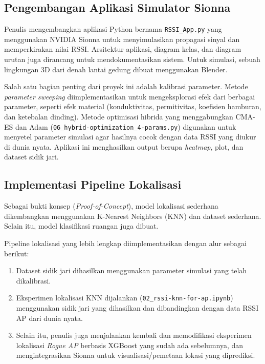 \subsection{Pengembangan Aplikasi Simulator Sionna}
Penulis mengembangkan aplikasi Python bernama \texttt{RSSI\_App.py} yang menggunakan NVIDIA Sionna untuk menyimulasikan propagasi sinyal dan memperkirakan nilai RSSI. Arsitektur aplikasi, diagram kelas, dan diagram urutan juga dirancang untuk mendokumentasikan sistem. Untuk simulasi, sebuah lingkungan 3D dari denah lantai gedung dibuat menggunakan Blender.

Salah satu bagian penting dari proyek ini adalah kalibrasi parameter. Metode \textit{parameter sweeping} diimplementasikan untuk mengeksplorasi efek dari berbagai parameter, seperti efek material (konduktivitas, permitivitas, koefisien hamburan, dan ketebalan dinding). Metode optimisasi hibrida yang menggabungkan CMA-ES dan Adam (\texttt{06\_hybrid-optimization\_4-params.py}) digunakan untuk menyetel parameter simulasi agar hasilnya cocok dengan data RSSI yang diukur di dunia nyata. Aplikasi ini menghasilkan output berupa \textit{heatmap}, plot, dan dataset sidik jari.

\subsection{Implementasi Pipeline Lokalisasi}
Sebagai bukti konsep (\textit{Proof-of-Concept}), model lokalisasi sederhana dikembangkan menggunakan K-Nearest Neighbors (KNN) dan dataset sederhana. Selain itu, model klasifikasi ruangan juga dibuat.

Pipeline lokalisasi yang lebih lengkap diimplementasikan dengan alur sebagai berikut:
\begin{enumerate}
    \item Dataset sidik jari dihasilkan menggunakan parameter simulasi yang telah dikalibrasi.
    \item Eksperimen lokalisasi KNN dijalankan (\texttt{02\_rssi-knn-for-ap.ipynb}) menggunakan sidik jari yang dihasilkan dan dibandingkan dengan data RSSI AP dari dunia nyata.
    \item Selain itu, penulis juga menjalankan kembali dan memodifikasi eksperimen lokalisasi \textit{Rogue AP} berbasis XGBoost yang sudah ada sebelumnya, dan mengintegrasikan Sionna untuk visualisasi/pemetaan lokasi yang diprediksi.
\end{enumerate}

